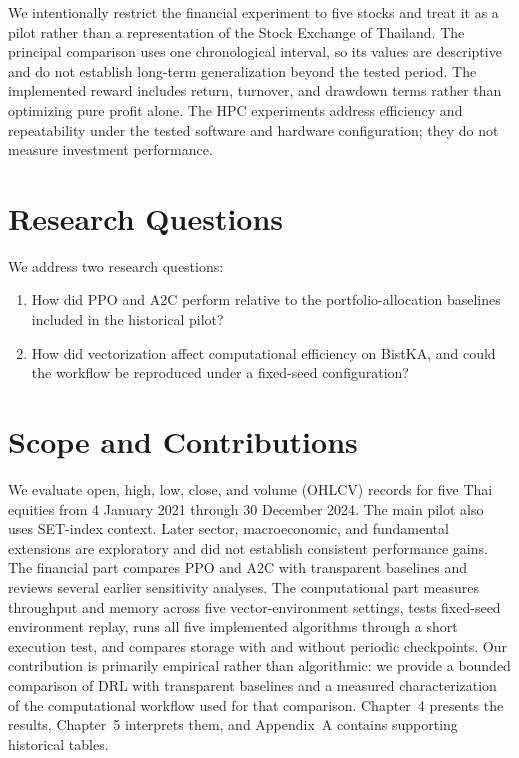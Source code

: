 \documentclass[12pt,a4paper,oneside]{book}
\theoremstyle{plain}
\numberwithin{equation}{chapter} \DeclareMathOperator{\Var}{Var}
\begin{document}
We intentionally restrict the financial experiment to five stocks and treat it as a pilot rather than a representation of the Stock Exchange of Thailand. The principal comparison uses one chronological interval, so its values are descriptive and do not establish long-term generalization beyond the tested period. The implemented reward includes return, turnover, and drawdown terms rather than optimizing pure profit alone. The HPC experiments address efficiency and repeatability under the tested software and hardware configuration; they do not measure investment performance.

\section{Research Questions}

We address two research questions:
\begin{enumerate}
  \item How did PPO and A2C perform relative to the portfolio-allocation baselines included in the historical pilot?
  \item How did vectorization affect computational efficiency on BistKA, and could the workflow be reproduced under a fixed-seed configuration?
\end{enumerate}

\section{Scope and Contributions}

We evaluate open, high, low, close, and volume (OHLCV) records for five Thai equities from 4 January 2021 through 30 December 2024. The main pilot also uses SET-index context. Later sector, macroeconomic, and fundamental extensions are exploratory and did not establish consistent performance gains. The financial part compares PPO and A2C with transparent baselines and reviews several earlier sensitivity analyses. The computational part measures throughput and memory across five vector-environment settings, tests fixed-seed environment replay, runs all five implemented algorithms through a short execution test, and compares storage with and without periodic checkpoints. Our contribution is primarily empirical rather than algorithmic: we provide a bounded comparison of DRL with transparent baselines and a measured characterization of the computational workflow used for that comparison. Chapter~4 presents the results, Chapter~5 interprets them, and Appendix~A contains supporting historical tables.
\end{document}
